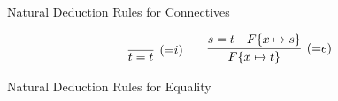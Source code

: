 \begin{definition}
\begin{table}[hbt]
\caption{Natural Deduction Rules for Connectives}
\label{tab:natural:deduction:connectives}
\end{table}

\begin{table}[hbt]
	\begin{gather*}
	\infer[({=}i)]{t=t}{}
	\qquad
	\infer[({=}e)]{F\{x\mapsto t\}}{s=t & F\{x\mapsto s\}}
	\end{gather*}
	\caption{Natural Deduction Rules for Equality}
	\label{tab:natural:deduction:equality}
\end{table}


\end{definition}
